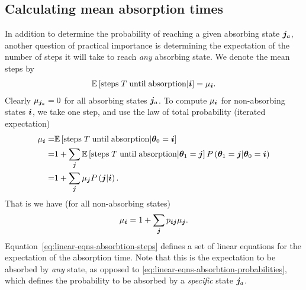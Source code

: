 \subsection{Calculating mean absorption times}

In addition to determine the probability of reaching a given absorbing state ${\bm j}_a$, another question of practical importance is determining the expectation of the number of steps it will take to reach \emph{any} absorbing state.
We denote the mean steps by
\begin{align}
    \mathbb{E}\left[\mathrm{steps}\;T\;\mathrm{until\;absorption}|{\bm i}\right]
    =
    \mu_{{\bm i}}
    .
\end{align}
Clearly $\mu_{{\bm j}_a}=0$ for all absorbing states ${\bm j}_a$.
To compute $\mu_{{\bm i}}$ for non-absorbing states ${\bm i}$, we take one step, and use the law of total probability (iterated expectation)
\begin{align}
    \label{eq:linear-eqns-absorbtion-steps-derivation}
    \mu_{{\bm i}}
    =&
    \mathbb{E}\left[\mathrm{steps}\;T\;\mathrm{until\;absorption}|{\bm \theta}_0={\bm i}\right]
    \nonumber\\
    =&
    1
    +
    \sum_{{\bm j}} \mathbb{E}\left[\mathrm{steps}\;T\;\mathrm{until\;absorption}|{\bm \theta}_1={\bm j}\right]
                P\left({\bm \theta}_1={\bm j}|{\bm \theta}_0={\bm i}\right)
    \nonumber\\
    =&
    1
    +
    \sum_{{\bm j}} \mu_{{\bm j}}P\left({\bm j}|{\bm i}\right)
    .
\end{align}
That is we have (for all non-absorbing states)
\begin{align}
    \label{eq:linear-eqns-absorbtion-steps}
    \mu_{{\bm i}}
    =
    1
    +
    \sum_{{\bm j}} p_{{\bm i}{\bm j}}\mu_{{\bm j}}
    .
\end{align}
Equation~\eqref{eq:linear-eqns-absorbtion-steps} defines a set of linear equations for the expectation of the absorption time.
Note that this is the expectation to be absorbed by \emph{any} state, as opposed to \eqref{eq:linear-eqns-absorbtion-probabilities}, which defines the probability to be absorbed by a \emph{specific} state ${\bm j}_a$. 
